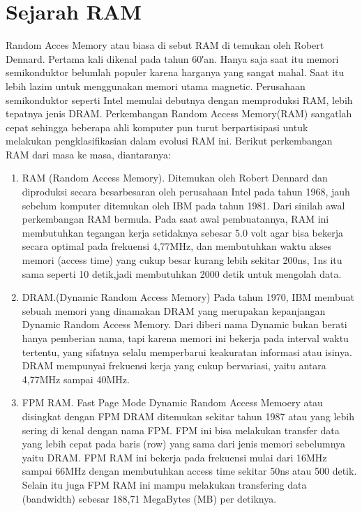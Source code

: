 \section{Sejarah RAM}
Random Acces Memory atau biasa di sebut RAM di temukan oleh Robert Dennard.
Pertama kali dikenal pada tahun 60′an. Hanya saja saat itu memori semikonduktor belumlah populer karena harganya yang sangat mahal. Saat itu lebih lazim untuk menggunakan memori utama magnetic. Perusahaan semikonduktor seperti Intel memulai debutnya dengan memproduksi RAM, lebih tepatnya jenis DRAM. 
Perkembangan Random Access Memory(RAM) sangatlah cepat sehingga beberapa ahli komputer pun turut berpartisipasi untuk melakukan pengklasifikasian dalam evolusi RAM ini. 
Berikut perkembangan RAM dari masa ke masa, diantaranya:

\begin{enumerate}
\item RAM (Random Access Memory). Ditemukan oleh Robert Dennard dan diproduksi secara besar\-besaran oleh perusahaan Intel pada tahun 1968, jauh sebelum komputer ditemukan oleh IBM pada tahun 1981. Dari sinilah awal perkembangan RAM bermula. Pada saat awal pembuatannya, RAM ini membutuhkan tegangan kerja setidaknya sebesar 5.0 volt agar bisa bekerja secara optimal pada frekuensi 4,77MHz, dan membutuhkan waktu akses memori (access time) yang cukup besar kurang lebih sekitar 200ns, 1ns itu sama seperti 10 detik,jadi membutuhkan 2000 detik untuk mengolah data.

\item DRAM.(Dynamic Random Access Memory) Pada tahun 1970, IBM membuat sebuah memori yang dinamakan DRAM yang merupakan kepanjangan Dynamic Random Access Memory. Dari diberi nama Dynamic bukan berati hanya pemberian nama, tapi karena memori ini bekerja pada interval waktu tertentu, yang sifatnya selalu memperbarui keakuratan informasi atau isinya. DRAM mempunyai frekuensi kerja yang cukup bervariasi, yaitu antara 4,77MHz sampai 40MHz. 

\item FPM RAM. Fast Page Mode Dynamic Random Access Memoery atau disingkat dengan FPM DRAM ditemukan sekitar tahun 1987 atau yang lebih sering di kenal dengan nama FPM. FPM ini bisa melakukan transfer data yang lebih cepat pada baris (row) yang sama dari jenis memori sebelumnya yaitu DRAM. FPM RAM ini bekerja pada frekuensi mulai dari 16MHz sampai 66MHz dengan membutuhkan access time sekitar 50ns atau 500 detik. Selain itu juga FPM RAM ini mampu melakukan transfering data (bandwidth) sebesar 188,71 MegaBytes (MB) per detiknya.


\end{enumerate}
